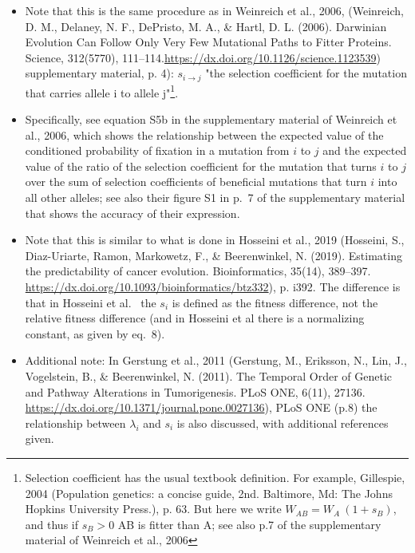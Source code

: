 \documentclass[11pt]{article}
\begin{document}
\begin{itemize}
\item Note that this is the same procedure as in Weinreich et al., 2006, (Weinreich, D. M., Delaney, N. F., DePristo, M. A., \& Hartl, D. L. (2006). Darwinian Evolution Can Follow Only Very Few Mutational Paths to Fitter Proteins. Science, 312(5770), 111–114.\url{https://dx.doi.org/10.1126/science.1123539}) supplementary material, p. 4): \(s_{i \rightarrow j}\) "the selection coefficient for the mutation that carries allele i to allele j"\footnote{Selection coefficient has the usual textbook definition. For example, Gillespie, 2004 (Population genetics: a concise guide, 2nd. Baltimore, Md: The Johns Hopkins University Press.), p. 63. But here we write \(W_{AB} = W_A \ (1 + s_B)\), and thus if \(s_B > 0\) AB is fitter than A; see also p.7 of the supplementary material of Weinreich et al., 2006}.

\item Specifically, see equation S5b in the supplementary material of Weinreich et al., 2006, which shows the relationship between the expected value of the conditioned probability of fixation in a mutation from \(i\) to \(j\) and the expected value of the ratio of the selection coefficient for the mutation that turns \(i\) to \(j\) over the sum of selection coefficients of beneficial mutations that turn \(i\) into all other alleles; see also their figure S1 in p.~7 of the supplementary material that shows the accuracy of their expression.


\item Note that this is similar to what is done in Hosseini et al., 2019 (Hosseini, S., Diaz-Uriarte, Ramon, Markowetz, F., \& Beerenwinkel, N. (2019). Estimating the predictability of cancer evolution. Bioinformatics,   35(14), 389–397. \url{https://dx.doi.org/10.1093/bioinformatics/btz332}), p. i392. The difference is that in Hosseini et al.~ the $s_i$ is defined as the fitness difference, not the relative fitness difference (and in Hosseini et al there is a normalizing constant, as given by eq.~8).


\item Additional note: In Gerstung et al., 2011 (Gerstung, M., Eriksson, N., Lin, J., Vogelstein, B., \& Beerenwinkel, N. (2011). The Temporal Order of Genetic and Pathway Alterations in Tumorigenesis. PLoS ONE, 6(11), 27136. \url{https://dx.doi.org/10.1371/journal.pone.0027136}), PLoS ONE (p.8) the relationship between \(\lambda_i\) and \(s_i\) is also discussed, with additional references given.

  


\end{itemize}
\end{document}
